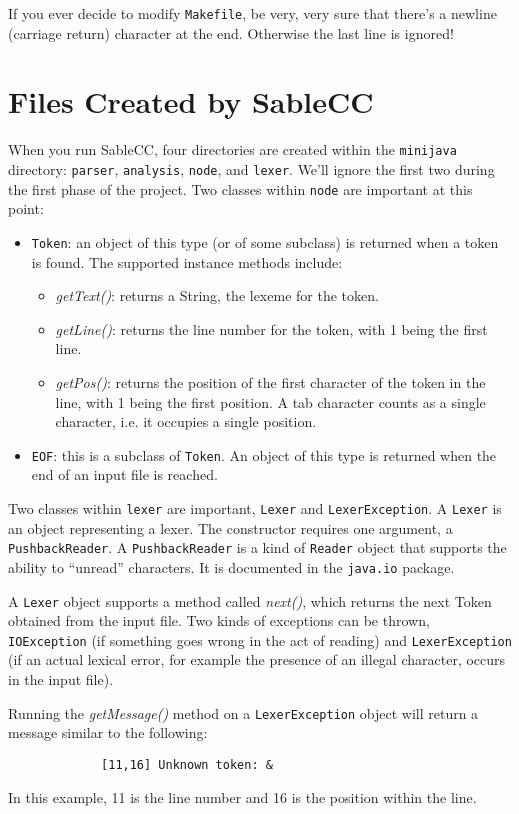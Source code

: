 \documentclass[11pt]{article}
\begin{document}
If you ever decide to modify {\tt Makefile}, be very, very sure that there's a newline (carriage return) character at the end.  Otherwise the last line is ignored!

\section{Files Created by SableCC}
When you run SableCC, four directories are created within the {\tt minijava} directory:  {\tt parser}, {\tt analysis}, {\tt node}, and {\tt lexer}.  We'll ignore the first two during the first phase of the project.  Two classes within {\tt node} are important at this point:
\begin{itemize}
\item{\tt Token}: an object of this type (or of some subclass) is returned when a token is found.  The supported instance methods include:
\begin{itemize}
\item{\em getText()}: returns a String, the lexeme for the token.
\item{\em getLine()}: returns the line number for the token, with 1 being the first line.
\item{\em getPos()}: returns the position of the first character of the token in the line, with 1 being the first position.  A tab character counts as a single character, i.e. it occupies a single position.
\end{itemize}
\item{\tt EOF}: this is a subclass of {\tt Token}.  An object of this type is returned when the end of an input file is reached.
\end{itemize}
Two classes within {\tt lexer} are important, {\tt Lexer} and {\tt LexerException}.  A {\tt Lexer} is
an object representing a lexer.  The constructor requires one argument, a {\tt PushbackReader}.  A {\tt PushbackReader} is a kind of {\tt Reader} object
that supports the ability to ``unread'' characters.  It is
documented in the {\tt java.io} package.

A {\tt Lexer} object supports a method called {\em next()}, which returns
the next Token obtained from the input file.  Two kinds of
exceptions can be thrown, {\tt IOException} (if something goes wrong
in the act of reading) and {\tt LexerException} (if an actual lexical
error, for example the presence of an illegal character, occurs
in the input file).

Running the {\em getMessage()} method on a {\tt LexerException} object will
return a message similar to the following:
\begin{verbatim}
      	     [11,16] Unknown token: & 
\end{verbatim}
In this example, 11 is the line number and 16 is the position
within the line.
\end{document}
